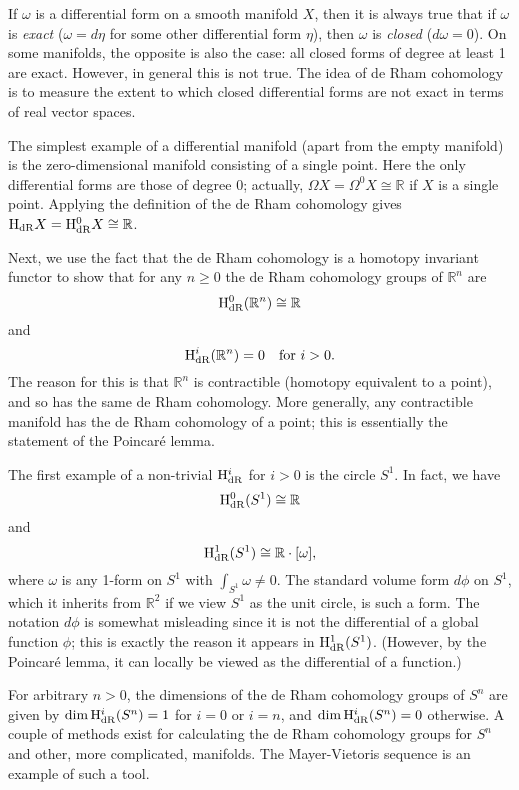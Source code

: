 \documentclass[12pt]{article}
\def\HdR{{\rm H}_{\rm dR}}
\begin{document}
If $\omega$ is a differential form on a smooth manifold $X$, then it is always true that if $\omega$ is {\em exact} ($\omega=d\eta$ for some other differential form $\eta$), then $\omega$ is {\em closed} ($d\omega=0$).  On some manifolds, the opposite is also the case: all closed forms of degree at least 1 are exact.  However, in general this is not true.  The idea of de Rham cohomology is to measure the extent to which closed differential forms are not exact in terms of real vector spaces.

The simplest example of a differential manifold (apart from the empty manifold) is the zero-dimensional manifold consisting of a single point.  Here the only differential forms are those of degree 0; actually, $\Omega X=\Omega^0 X\cong\mathbb{R}$ if $X$ is a single point.  Applying the definition of the de Rham cohomology gives $\HdR X=\HdR^0 X\cong\mathbb{R}$.

Next, we use the fact that the de Rham cohomology is a homotopy invariant functor to show that for any $n\ge 0$ the de Rham cohomology groups of $\mathbb{R}^n$ are 
$$
\HdR^0(\mathbb{R}^n)\cong\mathbb{R}
$$
and
$$
\HdR^i(\mathbb{R}^n)=0\quad\hbox{for $i>0$.}
$$
The reason for this is that $\mathbb{R}^n$ is contractible (homotopy equivalent to a point), and so has the same de Rham cohomology.  More generally, any contractible manifold has the de Rham cohomology of a point; this is essentially the statement of the Poincar\'e lemma.

The first example of a non-trivial $\HdR^i$ for $i>0$ is the circle $S^1$.  In fact, we have
$$
\HdR^0(S^1)\cong\mathbb{R}
$$
and
$$\HdR^1(S^1)\cong\mathbb{R}\cdot[\omega],
$$
where $\omega$ is any 1-form on $S^1$ with $\int_{S^1}\omega\ne0$.  The standard volume form $d\phi$ on $S^1$, which it inherits from $\mathbb{R}^2$ if we view $S^1$ as the unit circle, is such a form.  The notation $d\phi$ is somewhat misleading since it is not the differential of a global function $\phi$; this is exactly the reason it appears in $\HdR^1(S^1)$.  (However, by the Poincar\'e lemma, it can locally be viewed as the differential of a function.)

For arbitrary $n>0$, the dimensions of the de Rham cohomology groups of $S^n$ are given by $\dim\HdR^i(S^n)=1$ for $i=0$ or $i=n$, and $\dim\HdR^i(S^n)=0$ otherwise.  A couple of methods exist for calculating the de Rham cohomology groups for $S^n$ and other, more complicated, manifolds.  The Mayer-Vietoris sequence is an example of such a tool.
\end{document}

